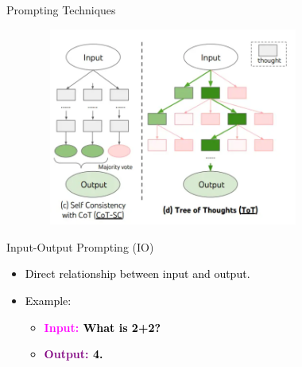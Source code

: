 \documentclass[aspectratio=169, xcolor={dvipsnames}, 10pt, brazil]{beamer}
\begin{document}
\begin{frame}{Prompting Techniques}
    \begin{figure}
        \centering
        \includegraphics[width=0.8\textwidth,height=6.5cm,keepaspectratio]{Type.png}
    \end{figure}
\end{frame}

\begin{frame}{Input-Output Prompting (IO)}

    \begin{itemize}
        \item \textcolor{black}{Direct relationship between input and output.}
        \item \textcolor{black}{Example:}
        \begin{itemize}
            \item \textbf{\textcolor{magenta}{Input:} \textcolor{black}{What is 2+2?}}
            \item \textbf{\textcolor{purple}{Output:} \textcolor{black}{4.}}
        \end{itemize}
    \end{itemize}

    \vspace{1cm} %

    \begin{center} %
    \end{center}

\end{frame}
\end{document}
